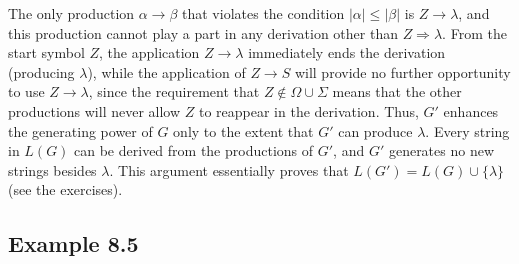 The only production $\alpha\rightarrow\beta$ that violates the condition
$|\alpha| \leq |\beta|$ is $Z\rightarrow\lambda$, and this production cannot
play a part in any derivation other than $Z\Rightarrow\lambda$. From the start
symbol $Z$, the application $Z\rightarrow\lambda$ immediately ends the
derivation (producing $\lambda$), while the application of $Z \rightarrow S$
will provide no further opportunity to use $Z\rightarrow\lambda$, since the
requirement that $Z\not \in\Omega\cup\Sigma$ means that the other productions will
never allow $Z$ to reappear in the derivation. Thus, $G'$ enhances the generating
power of $G$ only to the extent that $G'$ can produce $\lambda$. Every string in
$L(G)$ can be derived from the productions of $G'$, and $G'$ generates no new
strings besides $\lambda$. This argument essentially proves that $L(G') = L(G)
\cup\{\lambda\}$ (see the exercises).

\subsection*{Example 8.5}

